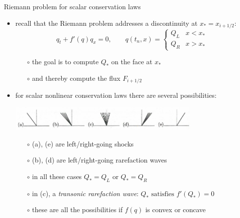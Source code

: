 \documentclass[10pt,hyperref,dvipsnames]{beamer}
\begin{document}
\begin{frame}{Riemann problem for scalar conservation laws}

\begin{itemize}
\item recall that the Riemann problem addresses a discontinuity at $x_*=x_{i+1/2}$:
    $$q_t + f'(q)q_x = 0, \qquad q(t_n,x) = \begin{cases} Q_L & x < x_* \\ Q_R & x > x_* \end{cases}$$

    \begin{itemize}
    \item[$\circ$] the goal is to compute $Q_*$ on the face at $x_*$
    \item[$\circ$] and thereby compute the flux $F_{i+1/2}$
    \end{itemize}
\item for scalar nonlinear conservation laws there are several possibilities:

\begin{center}
\includegraphics[width=0.75\textwidth]{figs/leveque12p1}
\end{center}

    \begin{itemize}
    \item[$\circ$] (a), (e) are left/right-going shocks
    \item[$\circ$] (b), (d) are left/right-going rarefaction waves
    \item[$\circ$] in all these cases $Q_*=Q_L$ or $Q_*=Q_R$
    \item[$\circ$] in (c), a \emph{transonic rarefaction wave}: $Q_* \text{ satisfies } f'(Q_*)=0$
    \item[$\circ$] these are all the possibilities if $f(q)$ is convex or concave
    \end{itemize}
\end{itemize}
\end{frame}
\end{document}
